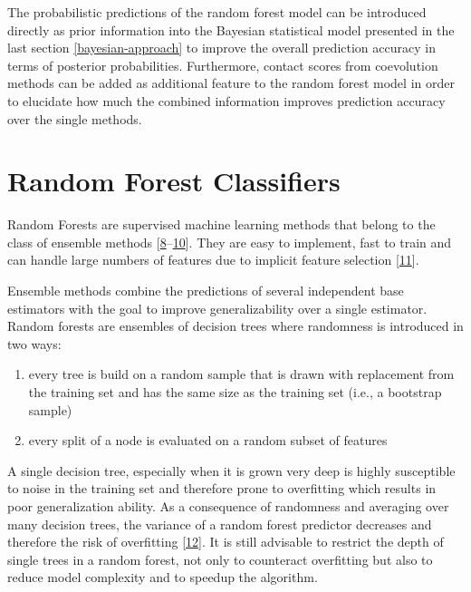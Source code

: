 \documentclass[12pt,a4paper,twoside]{book}
\providecommand{\tightlist}{%
  \setlength{\itemsep}{0pt}\setlength{\parskip}{0pt}}
\theoremstyle{definition}
\theoremstyle{definition}
\theoremstyle{remark}
\begin{document}
The probabilistic predictions of the random forest model can be
introduced directly as prior information into the Bayesian statistical
model presented in the last section \ref{bayesian-approach} to improve
the overall prediction accuracy in terms of posterior probabilities.
Furthermore, contact scores from coevolution methods can be added as
additional feature to the random forest model in order to elucidate how
much the combined information improves prediction accuracy over the
single methods.

\section{Random Forest Classifiers}\label{random-forest-classifiers}

Random Forests are supervised machine learning methods that belong to
the class of ensemble methods
{[}\protect\hyperlink{ref-Ho1998}{8}--\protect\hyperlink{ref-Breiman2001}{10}{]}.
They are easy to implement, fast to train and can handle large numbers
of features due to implicit feature selection
{[}\protect\hyperlink{ref-Menze2009}{11}{]}.

Ensemble methods combine the predictions of several independent base
estimators with the goal to improve generalizability over a single
estimator. Random forests are ensembles of decision trees where
randomness is introduced in two ways:

\begin{enumerate}
\def\labelenumi{\arabic{enumi}.}
\tightlist
\item
  every tree is build on a random sample that is drawn with replacement
  from the training set and has the same size as the training set (i.e.,
  a bootstrap sample)
\item
  every split of a node is evaluated on a random subset of features
\end{enumerate}

A single decision tree, especially when it is grown very deep is highly
susceptible to noise in the training set and therefore prone to
overfitting which results in poor generalization ability. As a
consequence of randomness and averaging over many decision trees, the
variance of a random forest predictor decreases and therefore the risk
of overfitting {[}\protect\hyperlink{ref-Louppe2014}{12}{]}. It is still
advisable to restrict the depth of single trees in a random forest, not
only to counteract overfitting but also to reduce model complexity and
to speedup the algorithm.
\end{document}
